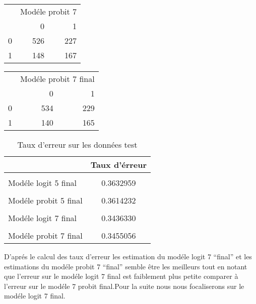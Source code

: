 \documentclass[
  14pt,
  french,
]{article}
\begin{document}
\begin{center}
\begin{tabular}{l|r|r}
\hline
\multicolumn{1}{c|}{ } & \multicolumn{2}{c}{Modéle probit 7} \\
\cline{2-3}
  & 0 & 1\\
\hline
0 & 526 & 227\\
\hline
1 & 148 & 167\\
\hline
\end{tabular}


\begin{tabular}{l|r|r}
\hline
\multicolumn{1}{c|}{ } & \multicolumn{2}{c}{Modéle probit 7 final} \\
\cline{2-3}
  & 0 & 1\\
\hline
0 & 534 & 229\\
\hline
1 & 140 & 165\\
\hline
\end{tabular}




\begin{table}[!h]

\caption{\label{tab:TERREURT}Taux d'erreur sur les données test}
\centering
\fontsize{10}{12}\selectfont
\begin{tabular}[t]{l|c}
\hline
  & Taux d'érreur\\
\hline
\cellcolor{gray!6}{Modéle logit 5} & \cellcolor{gray!6}{0.3632959}\\
\hline
Modéle logit 5 final & 0.3632959\\
\hline
\cellcolor{gray!6}{Modéle probit 5} & \cellcolor{gray!6}{0.3651685}\\
\hline
Modéle probit 5 final & 0.3614232\\
\hline
\cellcolor{gray!6}{Modéle logit 7} & \cellcolor{gray!6}{0.3539326}\\
\hline
Modéle logit 7 final & 0.3436330\\
\hline
\cellcolor{gray!6}{Modéle probit 7} & \cellcolor{gray!6}{0.3511236}\\
\hline
Modéle probit 7 final & 0.3455056\\
\hline
\end{tabular}
\end{table}
\end{center}

D'aprés le calcul des taux d'erreur les estimation du modéle logit 7
``final'' et les estimations du modéle probit 7 ``final'' semble être
les meilleurs tout en notant que l'erreur sur le modéle logit 7 final
est faiblement plus petite comparer à l'erreur sur le modéle 7 probit
final.Pour la suite nous nous focaliserons sur le modéle logit 7 final.
\end{document}
